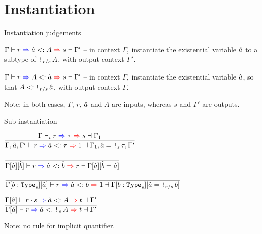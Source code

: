\documentclass{beamer}
\begin{document}
\section{Instantiation}

\begin{frame}{Instantiation judgements}

$\subinst{\Gamma}{r}{\evar{a}}{A}{s}{\Gamma'}$ -- in context $\Gamma$, instantiate the existential variable $\evar{a}$ to a subtype of $\Box[\divqty{r}{s}]{A}$, with output context $\Gamma'$.

\vspace{2em}

$\superinst{\Gamma}{r}{A}{\evar{a}}{s}{\Gamma'}$ -- in context $\Gamma$, instantiate the existential variable $\evar{a}$, so that $A <: \Box[\divqty{r}{s}]{\evar{a}}$, with output context $\Gamma$.

\vspace{2em}

Note: in both cases, $\Gamma$, $r$, $\evar{a}$ and $A$ are inputs, whereas $s$ and $\Gamma'$ are outputs.

\end{frame}

\begin{frame}{Sub-instantiation}

\begin{center}
  $\infrule{\newkinding{\Gamma}{r}{\tau}{s}{\Gamma_1}}{\subinst{\Gamma, \evar{a}, \Gamma'}{r}{\evar{a}}{\tau}{\One}{\Gamma_1, \evar{a}[\Box[s]{\tau}], \Gamma'}}$

  \vspace{2em}

  $\infrule{}{\subinst{\holectx{\holectx{\Gamma}{\evar{a}}}{\evar{b}}}{r}{\evar{a}}{\evar{b}}{r}{\holectx{\holectx{\Gamma}{\evar{a}}}{\evar{b}[\evar{a}]}}}$

  \vspace{2em}

  $\infrule{}{\subinst{\holectx{\holectx{\Gamma}{\var{b}{\Type[s]}}}{\evar{a}}}{r}{\evar{a}}{b}{\One}{\holectx{\holectx{\Gamma}{\var{b}{\Type[s]}}}{\evar{a}[\Box[\divqty{r}{s}]{b}]}}}$

  \vspace{2em}

  $\infrule{\subinst{\holectx{\Gamma}{\evar{a}}}{\mulqty{r}{s}}{\evar{a}}{A}{t}{\Gamma'}}{\subinst{\holectx{\Gamma}{\evar{a}}}{r}{\evar{a}}{\Box[s]{A}}{t}{\Gamma'}}$

  \vspace{2em}

  Note: no rule for implicit quantifier.
\end{center}

\end{frame}
\end{document}
